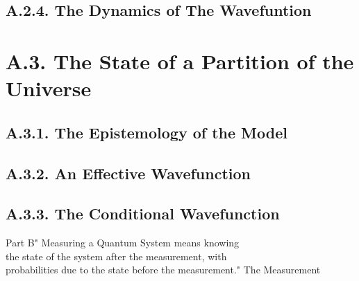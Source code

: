 \documentclass[11pt, a4paper]{article} %
\begin{document}
\subsection*{A.2.4. The Dynamics of The Wavefuntion}



\newpage
{}
\section*{A.3. The State of a Partition of the Universe}

\subsection*{A.3.1. The Epistemology of the Model}

\subsection*{A.3.2. An Effective Wavefunction}


\subsection*{A.3.3. The Conditional Wavefunction}


\newpage
\begin{kapituloBerria}{Part B}{" Measuring a Quantum System means knowing\\ the state of the system after the measurement, with\\ probabilities due to the state before the measurement."}
The Measurement 
\end{kapituloBerria}
\newpage
\fancyhead[L]{\null}
\fancyhead[R]{\null}
\null
\clearpage


\end{document}
